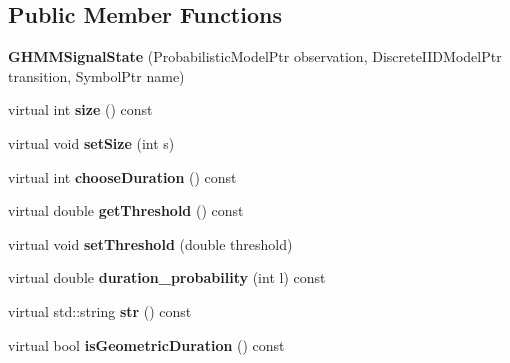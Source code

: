 \subsection*{Public Member Functions}
\begin{DoxyCompactItemize}
\item 
\mbox{\label{classtops_1_1GHMMSignalState_aea28862a4fc11c36188b61cbcfc73916}} 
{\bfseries G\+H\+M\+M\+Signal\+State} (Probabilistic\+Model\+Ptr observation, Discrete\+I\+I\+D\+Model\+Ptr transition, Symbol\+Ptr name)
\item 
\mbox{\label{classtops_1_1GHMMSignalState_abcaefd7fb338d7ac5f0a264b1c50664a}} 
virtual int {\bfseries size} () const
\item 
\mbox{\label{classtops_1_1GHMMSignalState_a5d8c08429ffe7b03e2ac715c21ede1ab}} 
virtual void {\bfseries set\+Size} (int s)
\item 
\mbox{\label{classtops_1_1GHMMSignalState_a2149cfb9264dc36b7146445d3940cf1d}} 
virtual int {\bfseries choose\+Duration} () const
\item 
\mbox{\label{classtops_1_1GHMMSignalState_a53e4742911bd19ec76a6c97df9fb626c}} 
virtual double {\bfseries get\+Threshold} () const
\item 
\mbox{\label{classtops_1_1GHMMSignalState_afefd69d7735606350ebe38d6788f55ce}} 
virtual void {\bfseries set\+Threshold} (double threshold)
\item 
\mbox{\label{classtops_1_1GHMMSignalState_a2d80f5ff151a322d2058bdb2fbcc00cc}} 
virtual double {\bfseries duration\+\_\+probability} (int l) const
\item 
\mbox{\label{classtops_1_1GHMMSignalState_a8f5bb288a212046737605d074ce61c88}} 
virtual std\+::string {\bfseries str} () const
\item 
\mbox{\label{classtops_1_1GHMMSignalState_a414fe1dda478ffedddacf745ddfc6985}} 
virtual bool {\bfseries is\+Geometric\+Duration} () const

\end{DoxyCompactItemize}
